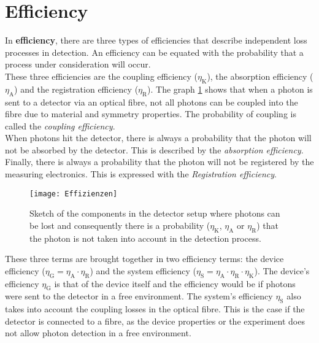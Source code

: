 \section{Efficiency}
In \textbf{efficiency}, there are three types of efficiencies that describe independent loss processes in detection.
An efficiency can be equated with the probability that a process under consideration will occur.\\
These three efficiencies are the coupling efficiency ($\eta_{\text{K}}$),
the absorption efficiency ($\eta_{\text{A}}$) and the registration efficiency ($\eta_{\text{R}}$).
The graph \ref{fig: single_efficiency_terms} shows that when a photon is sent to a detector via an optical fibre,
not all photons can be coupled into the fibre due to material and symmetry properties.
The probability of coupling is called the \textit{coupling efficiency}. \\
When photons hit the detector, there is always a probability that the photon will not be absorbed by the detector.
This is described by the \textit{absorption efficiency}. \\
Finally, there is always a probability that the photon will not be registered by the measuring electronics.
This is expressed with the \textit{Registration efficiency}. \\

\begin{figure}[hhh]
\texttt{[image: Effizienzen]}
\caption{Sketch of the components in the detector setup where photons can be lost and consequently there is a probability ($\eta_{\text{K}}$, $\eta_{\text{A}}$ or $\eta_{\text{R}}$) that the photon is not taken into account in the detection process.}
\label{fig: single_efficiency_terms}
\end{figure}

These three terms are brought together in two efficiency terms: the device efficiency
($\eta_{\text{G}} = \eta_{\text{A}} \cdot \eta_{\text{R}}$) and the system efficiency
($\eta_{\text{S}} = \eta_{\text{A}} \cdot \eta_{\text{R}} \cdot \eta_{\text{K}}$).
The device's efficiency $\eta_{\text{G}}$ is that of the device itself and the efficiency would be if photons were sent
to the detector in a free environment.
The system's efficiency $\eta_{\text{S}}$ also takes into account the coupling losses in the optical fibre.
This is the case if the detector is connected to a fibre, as the device properties or the experiment does not allow
photon detection in a free environment.\\

